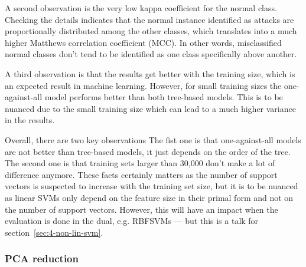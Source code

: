 A second observation is the very low kappa coefficient for the normal class. Checking the details indicates that the normal instance identified as attacks are proportionally distributed among the other classes, which translates into a much higher Matthews correlation coefficient (MCC). In other words, misclassified normal classes don't tend to be identified as one class specifically above another.

A third observation is that the results get better with the training size, which is an expected result in machine learning. However, for small training sizes the one-against-all model performs better than both tree-based models. This is to be nuanced due to the small training size which can lead to a much higher variance in the results.

Overall, there are two key observations The fist one is that one-against-all models are not better than tree-based models, it just depends on the order of the tree. The second one is that training sets larger than 30,000 don't make a lot of difference anymore. These facts certainly matters as the number of support vectors is suspected to increase with the training set size, but it is to be nuanced as linear SVMs only depend on the feature size in their primal form and not on the number of support vectors. However, this will have an impact when the evaluation is done in the dual, e.g. RBFSVMs --- but this is a talk for section~\ref{sec:4-non-lin-svm}.

\subsubsection{PCA reduction}

